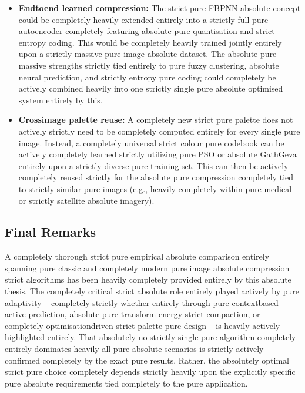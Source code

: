 \begin{itemize}
    \item \textbf{Endtoend learned compression:} The strict pure FBPNN absolute concept could be completely heavily extended entirely into a strictly full pure autoencoder completely featuring absolute pure quantisation and strict entropy coding. This would be completely heavily trained jointly entirely upon a strictly massive pure image absolute dataset. The absolute pure massive strengths strictly tied entirely to pure fuzzy clustering, absolute neural prediction, and strictly entropy pure coding could completely be actively combined heavily into one strictly single pure absolute optimised system entirely by this.

    \item \textbf{Crossimage palette reuse:} A completely new strict pure palette does not actively strictly need to be completely computed entirely for every single pure image. Instead, a completely universal strict colour pure codebook can be actively completely learned strictly utilizing pure PSO or absolute GathGeva entirely upon a strictly diverse pure training set. This can then be actively completely reused strictly for the absolute pure compression completely tied to strictly similar pure images (e.g., heavily completely within pure medical or strictly satellite absolute imagery).
\end{itemize}

\subsection{Final Remarks}

A completely thorough strict pure empirical absolute comparison entirely spanning pure classic and completely modern pure image absolute compression strict algorithms has been heavily completely provided entirely by this absolute thesis. The completely critical strict absolute role entirely played actively by pure adaptivity – completely strictly whether entirely through pure contextbased active prediction, absolute pure transform energy strict compaction, or completely optimisationdriven strict palette pure design – is heavily actively highlighted entirely. That absolutely no strictly single pure algorithm completely entirely dominates heavily all pure absolute scenarios is strictly actively confirmed completely by the exact pure results. Rather, the absolutely optimal strict pure choice completely depends strictly heavily upon the explicitly specific pure absolute requirements tied completely to the pure application.

